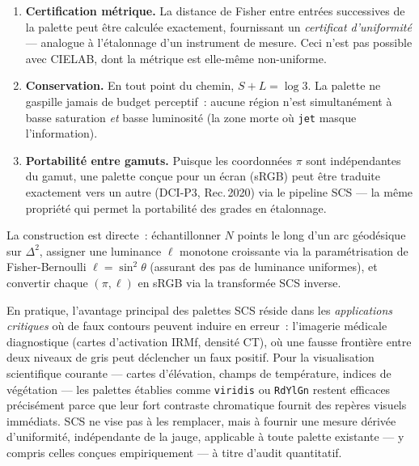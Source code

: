 \documentclass[12pt,a4paper]{article}
\begin{document}
\begin{enumerate}
\item \textbf{Certification m\'etrique.} La distance de Fisher entre
  entr\'ees successives de la palette peut \^etre calcul\'ee exactement,
  fournissant un \emph{certificat d'uniformit\'e} --- analogue \`a
  l'\'etalonnage d'un instrument de mesure. Ceci n'est pas possible
  avec CIELAB, dont la m\'etrique est elle-m\^eme non-uniforme.

\item \textbf{Conservation.} En tout point du chemin,
  $S + L = \log 3$. La palette ne \og gaspille \fg{} jamais de budget
  perceptif~: aucune r\'egion n'est simultan\'ement \`a basse
  saturation \emph{et} basse luminosit\'e (la zone morte o\`u
  \texttt{jet} masque l'information).

\item \textbf{Portabilit\'e entre gamuts.} Puisque les coordonn\'ees
  $\pi$ sont ind\'ependantes du gamut, une palette con\c{c}ue pour un
  \'ecran (sRGB) peut \^etre traduite exactement vers un autre
  (DCI-P3, Rec.\,2020) via le pipeline SCS --- la m\^eme propri\'et\'e
  qui permet la portabilit\'e des grades en \'etalonnage.
\end{enumerate}

La construction est directe~: \'echantillonner $N$ points le long d'un
arc g\'eod\'esique sur $\Delta^2$, assigner une luminance $\ell$
monotone croissante via la param\'etrisation de Fisher-Bernoulli
$\ell = \sin^2\theta$ (assurant des pas de luminance uniformes), et
convertir chaque $(\pi, \ell)$ en sRGB via la transform\'ee SCS
inverse.

En pratique, l'avantage principal des palettes SCS r\'eside dans les
\emph{applications critiques} o\`u de faux contours peuvent induire en
erreur~: l'imagerie m\'edicale diagnostique (cartes d'activation IRMf,
densit\'e CT), o\`u une fausse fronti\`ere entre deux niveaux de gris
peut d\'eclencher un faux positif. Pour la visualisation scientifique
courante --- cartes d'\'el\'evation, champs de temp\'erature, indices de
v\'eg\'etation --- les palettes \'etablies comme \texttt{viridis} ou
\texttt{RdYlGn} restent efficaces pr\'ecis\'ement parce que leur fort
contraste chromatique fournit des rep\`eres visuels imm\'ediats.
SCS ne vise pas \`a les remplacer, mais \`a fournir une mesure
d\'eriv\'ee d'uniformit\'e, ind\'ependante de la jauge, applicable \`a
toute palette existante --- y compris celles con\c{c}ues
empiriquement --- \`a titre d'audit quantitatif.
\end{document}
